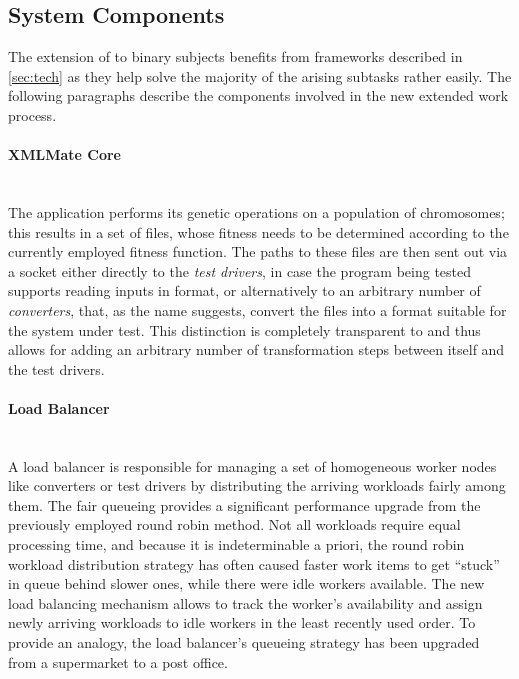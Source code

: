 \subsection{System Components}
\label{sec:components}
The extension of \xmlmate to binary subjects benefits from frameworks described in \cref{sec:tech} as they 
help solve the majority of the arising subtasks rather easily. The following paragraphs describe the
components involved in the new extended \xmlmate work process.
\paragraph{XMLMate Core} ~\\
  The \java application \xmlmate performs its genetic operations on a population of chromosomes; this 
  results in a set of \xml files, whose fitness needs to be determined according to the currently employed
  fitness function. The paths to these files are then sent out via a \zmq socket either directly to the
  \emph{test drivers}, in case the program being tested supports reading inputs in \xml format, or alternatively 
  to an arbitrary number of \emph{converters}, that, as the name suggests, convert the \xml files into a format 
  suitable for the system under test. This distinction is completely transparent to \xmlmate and thus allows for 
  adding an arbitrary number of transformation steps between itself and the test drivers.
  \paragraph{Load Balancer} ~\\
  A load balancer is responsible for managing a set of homogeneous worker nodes like converters or test
  drivers by distributing the arriving workloads fairly among them. The fair queueing provides a significant
  performance upgrade from the previously employed round robin method. Not all workloads require equal
  processing time, and because it is indeterminable a priori, the round robin workload distribution strategy
  has often caused faster work items to get ``stuck'' in queue behind slower ones, while there were idle
  workers available. The new load balancing mechanism allows to track the worker's availability and assign
  newly arriving workloads to idle workers in the least recently used order. To provide an analogy, the load
  balancer's queueing strategy has been upgraded from a supermarket to a post office. 
  
